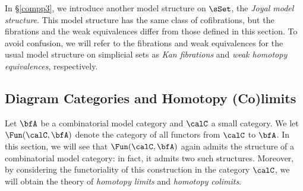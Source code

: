 \begin{remark}
In \S \ref{compp3}, we introduce another model structure on $\sSet$, the {\it Joyal model structure}. This model structure has the same class of cofibrations, but the fibrations and the weak equivalences differ from those defined in this section. To avoid confusion, we will refer to the fibrations and weak equivalences for the usual model structure on simplicial sets as {\it Kan fibrations} and {\it weak homotopy equivalences}, respectively.
\end{remark}


\subsection{Diagram Categories and Homotopy (Co)limits}\label{qlim7}

Let $\bfA$ be a combinatorial model category and $\calC$ a small category.
We let $\Fun(\calC, \bfA)$ denote the category of all functors from $\calC$ to $\bfA$.
In this section, we will see that $\Fun(\calC, \bfA)$ again admits the structure of a combinatorial model category: in fact, it admits two such structures. Moreover,
by considering the functoriality of this construction in the category $\calC$, we will obtain
the theory of {\it homotopy limits} and {\it homotopy colimits}.

